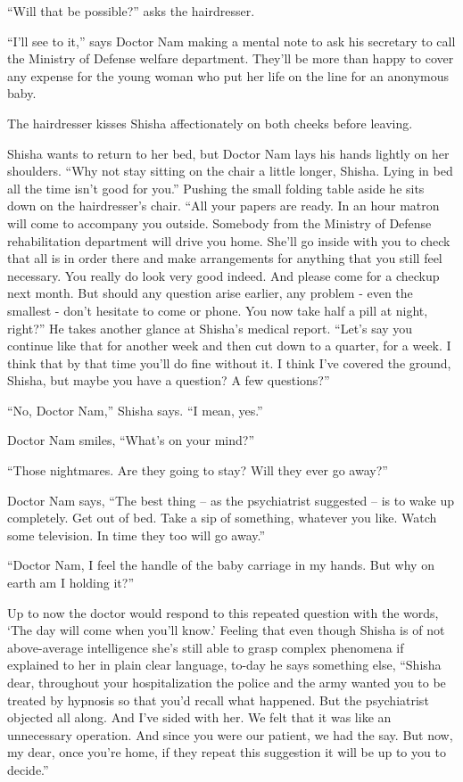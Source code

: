 \documentclass[twoside,11pt]{book}
\begin{document}
``Will that be possible?'' asks the hairdresser.

``I'll see to it,'' says Doctor Nam making a mental note to ask his secretary to call the
Ministry of Defense welfare department. They'll be more than happy to cover any expense for the young woman who put her
life on the line for an anonymous baby.

The hairdresser kisses Shisha affectionately on both cheeks before leaving.

Shisha wants to return to her bed, but Doctor Nam lays his hands lightly on her shoulders. ``Why not stay
sitting on the chair a little longer, Shisha. Lying in bed all the time isn't good for you.'' Pushing
the small folding table aside he sits down on the hairdresser's chair. ``All your papers are ready. In an
hour{ }matron will come to accompany you outside. Somebody from the Ministry of Defense rehabilitation
department will drive you home. She'll go inside with you to check that all is in order there and make arrangements for
anything that you still feel necessary. You really do look very good indeed. And please come for a checkup next month.
But should any question arise earlier, any problem - even the smallest - don't hesitate to come or phone. You now take
half a pill at night, right?'' He takes another glance at Shisha's medical report. ``Let's
say you continue like that for another week and then cut down to a quarter{,}
for a week. I think that by that time you'll do fine without it. I think I've covered the ground, Shisha, but maybe you
have a question? A few questions?''

``No, Doctor Nam,'' Shisha says. ``I mean, yes.''

Doctor Nam smiles, ``What's on your mind?''

``Those nightmares. Are they going to stay? Will they ever go away?''

Doctor Nam says, ``The best thing -- as the psychiatrist suggested -- is to wake up completely. Get out of
bed. Take a sip of something,{ }whatever you like. Watch some television. In
time they too will go away.''

``Doctor Nam, I feel the handle of the baby carriage in my hands. But why on earth am I holding
it?''

Up to now the doctor would respond to this repeated question with the words, `The day will come when you'll know.'
Feeling that even though Shisha is of not above{{}-}average intelligence she's
still able to grasp complex phenomena if explained to her in plain clear language, to-day he says something else,
``Shisha dear, throughout your hospitalization the police and the army wanted you to be treated by
hypnosis so that you'd recall what happened. But the psychiatrist objected all along. And I've sided with her. We felt
that it was like an unnecessary operation. And since you were our patient, we had the say. But now, my dear, once
you're home, if they repeat this suggestion it will be up to you to decide.''
\end{document}
